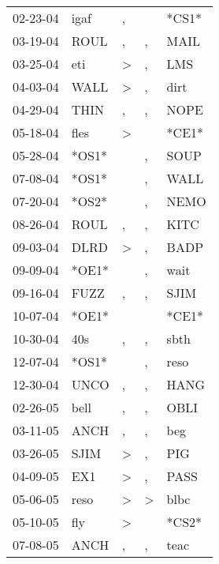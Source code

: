 \begin{supertabular}{lllll}
 02-23-04 &   igaf &                , &                  &  *CS1* \\
 03-19-04 &   ROUL &                , &                , &   MAIL \\
 03-25-04 &    eti &     \textgreater &                , &    LMS \\
 04-03-04 &   WALL &     \textgreater &                , &   dirt \\
 04-29-04 &   THIN &                , &                , &   NOPE \\
 05-18-04 &   fles &     \textgreater &                  &  *CE1* \\
 05-28-04 &  *OS1* &                  &                , &   SOUP \\
 07-08-04 &  *OS1* &                  &                , &   WALL \\
 07-20-04 &  *OS2* &                  &                , &   NEMO \\
 08-26-04 &   ROUL &                , &                , &   KITC \\
 09-03-04 &   DLRD &     \textgreater &                , &   BADP \\
 09-09-04 &  *OE1* &                  &                , &   wait \\
 09-16-04 &   FUZZ &                , &                , &   SJIM \\
 10-07-04 &  *OE1* &                  &                  &  *CE1* \\
 10-30-04 &    40s &                , &                , &   sbth \\
 12-07-04 &  *OS1* &                  &                , &   reso \\
 12-30-04 &   UNCO &                , &                , &   HANG \\
 02-26-05 &   bell &                , &                , &   OBLI \\
 03-11-05 &   ANCH &                , &                , &    beg \\
 03-26-05 &   SJIM &     \textgreater &                , &    PIG \\
 04-09-05 &    EX1 &     \textgreater &                , &   PASS \\
 05-06-05 &   reso &     \textgreater &     \textgreater &   blbc \\
 05-10-05 &    fly &     \textgreater &                  &  *CS2* \\
 07-08-05 &   ANCH &                , &                , &   teac \\

\end{supertabular}
